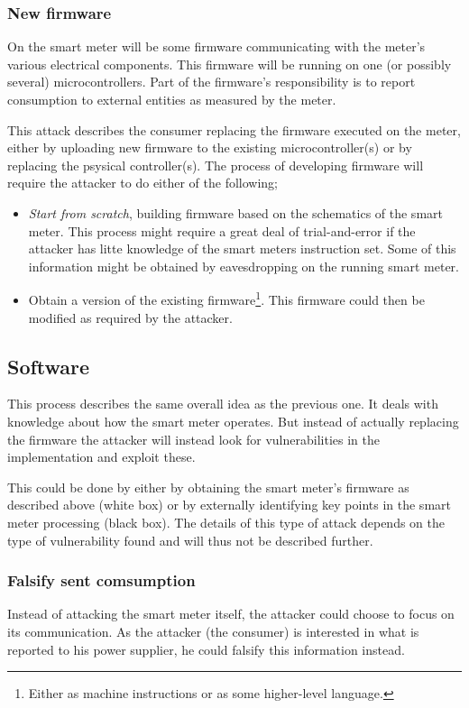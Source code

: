 \subsubsection{New firmware}
On the smart meter will be some firmware communicating with the meter's various electrical components.
This firmware will be running on one (or possibly several) microcontrollers.
Part of the firmware's responsibility is to report consumption to external entities as measured by the meter.

This attack describes the consumer replacing the firmware executed on the meter, either by uploading new firmware to the existing microcontroller(s) or by replacing the psysical controller(s).
The process of developing firmware will require the attacker to do either of the following;
\begin{itemize}
  \item \emph{Start from scratch}, building firmware based on the schematics of the smart meter.
  This process might require a great deal of trial-and-error if the attacker has litte knowledge of the smart meters instruction set.
  Some of this information might be obtained by eavesdropping on the running smart meter.
  \item Obtain a version of the existing firmware\footnote{Either as machine instructions or as some higher-level language.}.
  This firmware could then be modified as required by the attacker.
\end{itemize}

\subsection{Software}
This process describes the same overall idea as the previous one.
It deals with knowledge about how the smart meter operates.
But instead of actually replacing the firmware the attacker will instead look for vulnerabilities in the implementation and exploit these.

This could be done by either by obtaining the smart meter's firmware as described above (white box) or by externally identifying key points in the smart meter processing (black box).
The details of this type of attack depends on the type of vulnerability found and will thus not be described further.

\subsubsection{Falsify sent comsumption}
Instead of attacking the smart meter itself, the attacker could choose to focus on its communication.
As the attacker (the consumer) is interested in what is reported to his power supplier, he could falsify this information instead.

